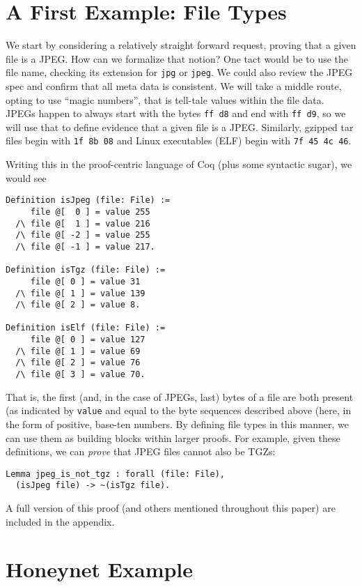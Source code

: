 \documentclass[nocopyrightspace]{sigplanconf}
\begin{document}
\section{A First Example: File Types}

We start by considering a relatively straight forward request, proving that a
given file is a JPEG. How can we formalize that notion? One tact would be to
use the file name, checking its extension for {\tt jpg} or {\tt jpeg}. We
could also review the JPEG spec and confirm that all meta data is consistent.
We will take a middle route, opting to use ``magic numbers'', that is
tell-tale values within the file data. JPEGs happen to always start with the
bytes {\tt ff d8} and end with {\tt ff d9}, so we will use that to define
evidence that a given file is a JPEG. Similarly, gzipped tar files begin with
{\tt 1f 8b 08} and Linux executables (ELF) begin with {\tt 7f 45 4c 46}.

Writing this in the proof-centric language of Coq (plus some syntactic sugar),
we would see

\begin{lstlisting}
Definition isJpeg (file: File) :=
     file @[  0 ] = value 255
  /\ file @[  1 ] = value 216 
  /\ file @[ -2 ] = value 255
  /\ file @[ -1 ] = value 217.

Definition isTgz (file: File) :=
     file @[ 0 ] = value 31
  /\ file @[ 1 ] = value 139 
  /\ file @[ 2 ] = value 8.

Definition isElf (file: File) :=
     file @[ 0 ] = value 127
  /\ file @[ 1 ] = value 69 
  /\ file @[ 2 ] = value 76
  /\ file @[ 3 ] = value 70.
\end{lstlisting}

That is, the first (and, in the case of JPEGs, last) bytes of a file are both
present (as indicated by {\tt value} and equal to the byte sequences described
above (here, in the form of positive, base-ten numbers. By defining file types
in this manner, we can use them as building blocks within larger proofs. For
example, given these definitions, we can {\it prove} that JPEG files cannot
also be TGZs:

\begin{lstlisting}
Lemma jpeg_is_not_tgz : forall (file: File),
  (isJpeg file) -> ~(isTgz file).
\end{lstlisting}

A full version of this proof (and others mentioned throughout this paper) are
included in the appendix.

\section{Honeynet Example}
\end{document}
